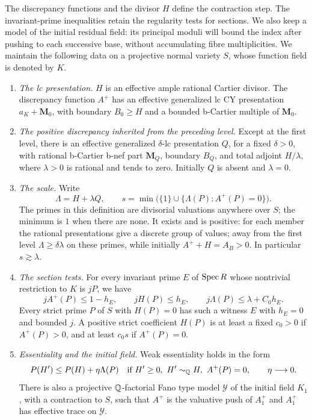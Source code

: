 The discrepancy functions and the divisor $H$ define the contraction step.
The invariant-prime inequalities retain the regularity tests for sections.
We also keep a model of the initial residual field: its principal moduli
will bound the index after pushing to each successive base, without
accumulating fibre multiplicities.
We maintain the following data on a projective normal variety $S$, whose
function field is denoted by $K$.
\begin{enumerate}
\item \emph{The lc presentation.} $H$ is an effective ample rational Cartier divisor.  The discrepancy
function $A^+$ has an effective generalized lc CY presentation
$a_K+\mathbf M_0$, with boundary $B_0\ge H$ and a bounded b-Cartier
multiple of $\mathbf M_0$.
\item \emph{The positive discrepancy inherited from the preceding level.}
Except at the first level, there is an effective generalized
$\delta$-lc presentation $Q$, for a fixed $\delta>0$, with rational
b-Cartier b-nef part $\mathbf M_Q$, boundary $B_Q$, and total adjoint
$H/\lambda$, where
$\lambda>0$ is rational and tends to zero.  Initially $Q$ is absent and
$\lambda=0$.
\item \emph{The scale.} Write
\[
 \Lambda=H+\lambda Q,
 \qquad s=\min\bigl(\{1\}\cup
       \{\Lambda(P): A^+(P)=0\}\bigr).
\]
The primes in this definition are divisorial valuations anywhere over
$S$; the minimum is $1$ when there are none.  It exists and is positive:
for each member the rational presentations give a discrete group of
values; away from the first level $\Lambda\ge\delta\lambda$ on these
primes, while initially $A^++H=A_B>0$.  In particular $s\gtrsim\lambda$.
\item \emph{The section tests.} For every invariant prime $E$ of $\operatorname{Spec} R$ whose nontrivial
restriction to $K$ is $jP$, we have
\begin{equation}\label{eq:B2}
 jA^+(P)\le1-h_E,\qquad jH(P)\le h_E,\qquad
 j\Lambda(P)\le\lambda+C_0h_E.
\end{equation}
Every strict prime $P$ of $S$ with $H(P)=0$ has such a witness $E$ with
$h_E=0$ and bounded $j$.  A positive strict coefficient $H(P)$ is at
least a fixed $c_0>0$ if $A^+(P)>0$, and at least $c_0s$ if $A^+(P)=0$.
\item \emph{Essentiality and the initial field.} Weak essentiality holds in the form
\begin{equation}\label{b:scale-essentiality}
 P(H')\le P(H)+\eta\Lambda(P)
 \quad\text{if }H'\ge0,\ H'\sim_{\mathbb Q}H,\ A^+(P)=0,
 \qquad \eta\longrightarrow0.
\end{equation}
There is also a projective $\mathbb Q$-factorial Fano type model
$\mathcal Y$ of the initial field $K_1$, with a contraction to $S$,
such that $A^+$ is the valuative push of $A_1^+$ and $A_1^+$ has
effective trace on $\mathcal Y$.
\end{enumerate}

